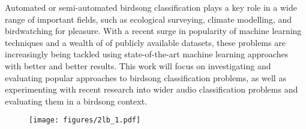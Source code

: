 Automated or semi-automated birdsong classification plays a key role in a
wide range of important fields, such as ecological surveying, climate modelling,
and birdwatching for pleasure. With a recent surge in popularity of machine
learning techniques and a wealth of of publicly available datasets, these
problems are increasingly being tackled using state-of-the-art machine learning
approaches with better and better results. This work will focus on investigating
and evaluating popular approaches to birdsong classification problems, as well
as experimenting with recent research into wider audio classification problems
and evaluating them in a birdsong context.

\begin{figure}[!b]
  \centering
  \texttt{[image: figures/2lb\_1.pdf]}
\end{figure}
